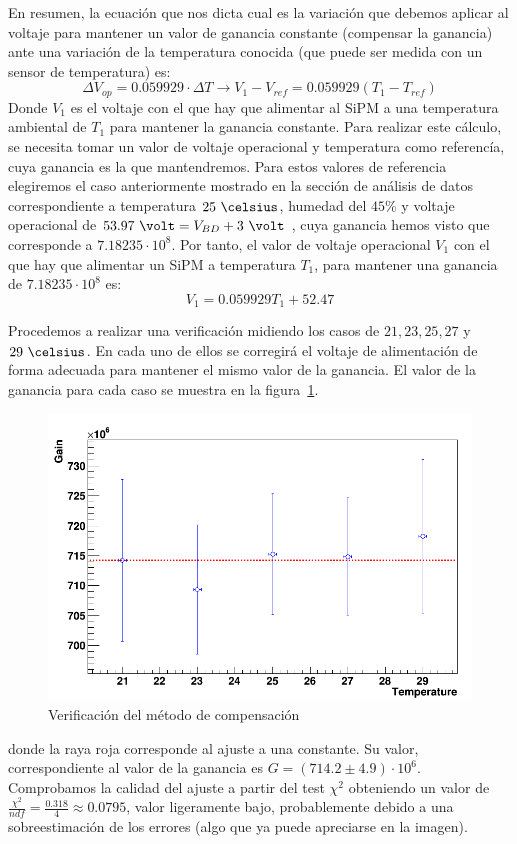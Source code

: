 En resumen, la ecuación que nos dicta cual es la variación que debemos aplicar al voltaje para mantener un valor de ganancia constante (compensar la ganancia) ante una variación de la temperatura conocida (que puede ser medida con un sensor de temperatura) es:
\begin{equation}
\Delta V_{op}=0.059929 \cdot \Delta T \longrightarrow V_1-V_{ref}=0.059929(T_1-T_{ref})
\label{compensacionfinal}
\end{equation}
Donde $V_1$ es el voltaje con el que hay que alimentar al SiPM a una temperatura ambiental de $T_1$ para mantener la ganancia constante. Para realizar este cálculo, se necesita tomar un valor de voltaje operacional y temperatura como referencía, cuya ganancia es la que mantendremos. Para estos valores de referencia elegiremos el caso anteriormente mostrado en la sección de análisis de datos correspondiente a temperatura $25~\celsius$, humedad del $45\% $ y voltaje operacional de $53.97~\volt = V_{BD}+ 3~\volt$ , cuya ganancia hemos visto que corresponde a $7.18235 \cdot 10^8$. Por tanto, el valor de voltaje operacional $V_1$ con el que hay que alimentar un SiPM a temperatura $T_1$, para mantener una ganancia de $7.18235 \cdot 10^8$ es:
\begin{equation}
V_1=0.059929T_1+52.47
\label{compensacionfinal}
\end{equation}




Procedemos a realizar una verificación midiendo los casos de $21, 23, 25, 27$ y  $29~\celsius$. En cada uno de ellos se corregirá el voltaje de alimentación de forma adecuada para mantener el mismo valor de la ganancia. El valor de la ganancia para cada caso se muestra en la figura~\ref{compensacion}. 

\begin{figure}[hbtp]
\centering
\includegraphics[scale=0.4]{compensacion.png}
\caption{Verificación del método de compensación\label{compensacion}}
\end{figure}
donde la raya roja corresponde al ajuste a una constante. Su valor, correspondiente al valor de la ganancia es $G=(714.2 \pm 4.9) \cdot 10^6$. Comprobamos la calidad del ajuste a partir del test $\chi^2$ obteniendo un valor de $\frac{\chi^2}{ndf}=\frac{0.318}{4}\approx 0.0795$, valor ligeramente bajo, probablemente debido a una sobreestimación de los errores (algo que ya puede apreciarse en la imagen).

